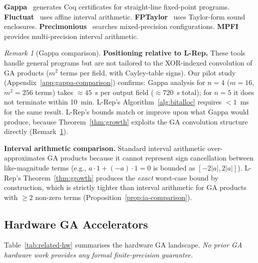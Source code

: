 \documentclass[11pt,a4paper]{article}
\theoremstyle{definition}
\theoremstyle{plain}
\theoremstyle{remark}
\newtheorem{remark}{Remark}[section]
\begin{document}
\textbf{Gappa}~\cite{gappa} generates Coq certificates for straight-line
fixed-point programs.
\textbf{Fluctuat}~\cite{fluctuat} uses affine interval arithmetic.
\textbf{FPTaylor}~\cite{fptaylor} uses Taylor-form sound enclosures.
\textbf{Precimonious}~\cite{precimonious} searches mixed-precision
configurations.
\textbf{MPFI}~\cite{mpfi} provides multi-precision interval arithmetic.

\begin{remark}[Gappa comparison]\label{rem:gappa-comparison}
\textbf{Positioning relative to L-Rep.}
These tools handle general programs but are not tailored to the
XOR-indexed convolution of GA products ($m^2$ terms per field, with
Cayley-table signs).
Our pilot study (Appendix~\ref{app:gappa-comparison}) confirms:
Gappa analysis for $n=4$ ($m=16$, $m^2=256$ terms) takes
$\approx 45$~s per output field ($\approx 720$~s total); for $n=5$ it
does not terminate within 10~min.
L-Rep's Algorithm~\ref{alg:bitalloc} requires $<1$~ms for the same result.
L-Rep's bounds match or improve upon what Gappa would produce,
because Theorem~\ref{thm:growth} exploits the GA convolution structure
directly (Remark~\ref{rem:gappa-comparison}).

\textbf{Interval arithmetic comparison.}
Standard interval arithmetic over-approximates GA products because it
cannot represent sign cancellation between like-magnitude terms
(e.g., $a \cdot 1 + (-a) \cdot 1 = 0$ is bounded as $[-2|a|, 2|a|]$).
L-Rep's Theorem~\ref{thm:growth} produces the \emph{exact} worst-case
bound by construction, which is strictly tighter than interval
arithmetic for GA products with $\ge 2$ non-zero terms
(Proposition~\ref{prop:ia-comparison}).

\subsection{Hardware GA Accelerators}
\label{sec:related-hw}

Table~\ref{tab:related-hw} summarises the hardware GA landscape.
\emph{No prior GA hardware work provides any formal finite-precision
guarantee.}


\end{remark}
\end{document}
